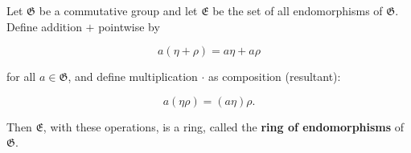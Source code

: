 Let $\mathfrak{G}$ be a commutative group and let $\mathfrak{E}$ be the set of all endomorphisms of $\mathfrak{G}$. Define addition $+$ pointwise by

$$a(\eta + \rho) = a\eta + a\rho$$

for all $a \in \mathfrak{G}$, and define multiplication $\cdot$ as composition (resultant):

$$a(\eta\rho) = (a\eta)\rho.$$

Then $\mathfrak{E}$, with these operations, is a ring, called the \textbf{ring of endomorphisms} of $\mathfrak{G}$.
